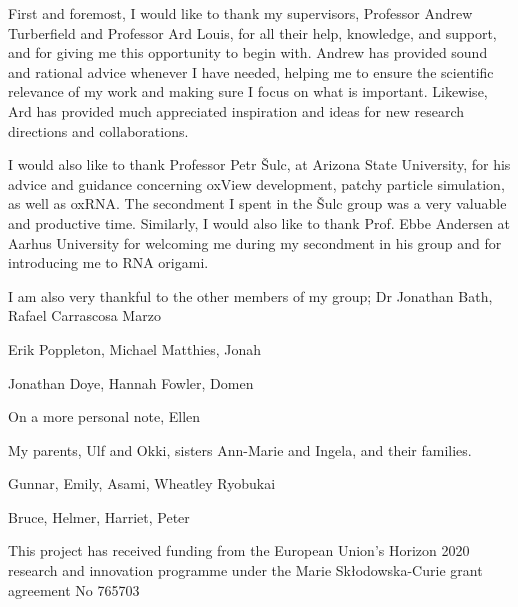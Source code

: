 

First and foremost, I would like to thank my supervisors, Professor Andrew Turberfield and Professor Ard Louis, for all their help, knowledge, and support, and for giving me this opportunity to begin with. Andrew has provided sound and rational advice whenever I have needed, helping me to ensure the scientific relevance of my work and making sure I focus on what is important. Likewise, Ard has provided much appreciated inspiration and ideas for new research directions and collaborations.

I would also like to thank Professor Petr {\v{S}}ulc, at Arizona State University, for his advice and guidance concerning oxView development, patchy particle simulation, as well as oxRNA. The secondment I spent in the {\v{S}}ulc group was a very valuable and productive time. Similarly, I would also like to thank Prof. Ebbe Andersen at Aarhus University for welcoming me during my secondment in his group and for introducing me to RNA origami.

I am also very thankful to the other members of my group; Dr Jonathan Bath, Rafael Carrascosa Marzo

Erik Poppleton, Michael Matthies, Jonah

Jonathan Doye, Hannah Fowler, Domen

On a more personal note, Ellen

My parents, Ulf and Okki, sisters Ann-Marie and Ingela, and their families.

Gunnar, Emily, Asami, Wheatley Ryobukai

Bruce, Helmer, Harriet, Peter




This project has received funding from the European Union’s Horizon 2020 research and innovation programme under the Marie Skłodowska-Curie grant agreement No 765703
